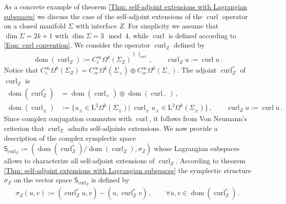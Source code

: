 \begin{Example}
	As a concrete example of theorem \ref{Thm: self-adjoint extensions with Lagrangian subspaces} we discuss the case of the self-adjoint extensions of the $\operatorname{curl}$ operator on a closed manifold $\Sigma$ with interface $Z$.
	For simplicity we assume that $\dim\Sigma=2k+1$ with $\dim\Sigma=3\mod 4$, while $\operatorname{curl}$ is defined according to \eqref{Eqn: curl convention}.
	We consider the operator $\operatorname{curl}_Z$ defined by
	\begin{align}\label{Eqn: Z-curl operator}
		\operatorname{dom}(\operatorname{curl}_Z):=\overline{C^\infty_{\mathrm{c}}\Omega^k(\Sigma_Z)}^{\|\|_{\operatorname{curl}}}\,,\qquad
		\operatorname{curl}_Zu:=\operatorname{curl}u\,.
	\end{align}
	Notice that $C^\infty_{\mathrm{c}}\Omega^k(\Sigma_Z)=C^\infty_{\mathrm{cc}}\Omega^k(\Sigma_+)\oplus C^\infty_{\mathrm{cc}}\Omega^k(\Sigma_-)$.
	The adjoint $\operatorname{curl}_Z^*$ of $\operatorname{curl}_Z$ is
	\begin{align}\label{Eqn: adjoint of Z-curl operator}
		\operatorname{dom}(\operatorname{curl}_Z^*)&=
		\operatorname{dom}(\operatorname{curl}_+)\oplus\operatorname{dom}(\operatorname{curl}_-)\,,\\
		\operatorname{dom}(\operatorname{curl}_\pm)&:=\lbrace
		u_\pm\in\mathrm{L}^2\Omega^k(\Sigma_\pm)|\;\operatorname{curl}_\pm u_\pm\in\mathrm{L}^2\Omega^k(\Sigma_\pm)\rbrace\,,\qquad
		\operatorname{curl}_Zu:=\operatorname{curl}u\,.
	\end{align}
	Since complex conjugation commutes with $\operatorname{curl}$, it follows from Von Neumann's criterion \cite[Thm. 5.43]{Moretti-18} that $\operatorname{curl}_Z$ admits self-adjoints extensions.
	We now provide a description of the complex symplectic space $\mathsf{S}_{\operatorname{curl}_Z}:=(\operatorname{dom}(\operatorname{curl}_Z^*)/\operatorname{dom}(\operatorname{curl}_Z),\sigma_Z)$ whose Lagrangian subspaces allows to characterize all self-adjoint extensions of $\operatorname{curl}_Z$.
	According to theorem \ref{Thm: self-adjoint extensions with Lagrangian subspaces} the symplectic structure $\sigma_Z$ on the vector space $\mathsf{S}_{\operatorname{curl}_Z}$ is defined by
	\begin{align}\label{Eqn: presymplectic structure over the adjoint of Z-curl operator}
		\sigma_Z(u,v):=
		(\operatorname{curl}_Z^*u,v)-(u,\operatorname{curl}_Z^*v)\,,\qquad
		\forall u,v\in\operatorname{dom}(\operatorname{curl}_Z^*)\,.
	\end{align}

\end{Example}
